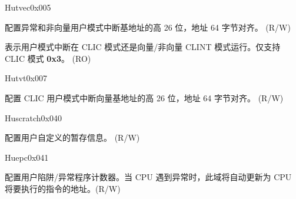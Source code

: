 \begin{register}{H}{utvec}{0x005}\label{regdesc:UTVEC}
%
%
%
\regnewline%
\begin{regdesc}\begin{reglist}
\label{fielddesc:UTVECBASE}\item [BASE] 配置异常和非向量用户模式中断基地址的高 26 位，地址 64 字节对齐。 (R/W)
\label{fielddesc:UTVECMODE}\item [MODE] 表示用户模式中断在 CLIC 模式还是向量/非向量 CLINT 模式运行。仅支持 CLIC 模式 \textbf{0x3}。 (RO)
\end{reglist}\end{regdesc}
\end{register}

\begin{register}{H}{utvt}{0x007}\label{regdesc:UTVT}
%
%
\regnewline%
\begin{regdesc}\begin{reglist}
\label{fielddesc:UTVTBASE}\item [BASE] 配置 CLIC 用户模式中断向量基地址的高 26 位，地址 64 字节对齐。 (R/W)
\end{reglist}\end{regdesc}
\end{register}

\begin{register}{H}{uscratch}{0x040}\label{regdesc:USCRATCH}
%
\regnewline%
\begin{regdesc}\begin{reglist}
\label{fielddesc:USCRATCH}\item [USCRATCH] 配置用户自定义的暂存信息。 (R/W)
\end{reglist}\end{regdesc}
\end{register}

\begin{register}{H}{uepc}{0x041}\label{regdesc:UEPC}
%
\regnewline%
\begin{regdesc}\begin{reglist}
\label{fielddesc:UEPC}\item [UEPC] 配置用户陷阱/异常程序计数器。当 CPU 遇到异常时，此域将自动更新为 CPU 将要执行的指令的地址。(R/W)
\end{reglist}\end{regdesc}
\end{register}

